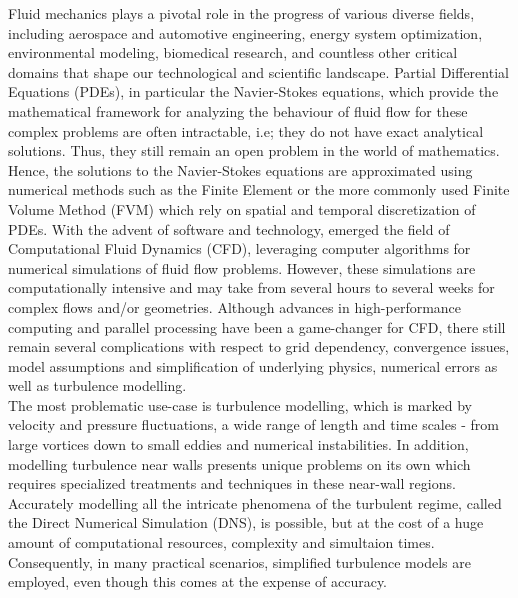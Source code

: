 Fluid mechanics plays a pivotal role in the progress of various diverse fields, including aerospace and automotive engineering, energy system optimization, environmental modeling, biomedical research, and countless other critical domains that shape our technological and scientific landscape. Partial Differential Equations (PDEs), in particular the Navier-Stokes equations, which provide the mathematical framework for analyzing the behaviour of fluid flow for these complex problems are often intractable, i.e; they do not have exact analytical solutions. Thus, they still remain an open problem in the world of mathematics. Hence, the solutions to the Navier-Stokes equations are approximated using numerical methods such as the Finite Element or the more commonly used Finite Volume Method (FVM) which rely on spatial and temporal discretization of PDEs. With the advent of software and technology, emerged the field of Computational Fluid Dynamics (CFD), leveraging computer algorithms for numerical simulations of fluid flow problems. However, these simulations are computationally intensive and may take from several hours to several weeks for complex flows and/or geometries. Although advances in high-performance computing and parallel processing have been a game-changer for CFD, there still remain several complications with respect to grid dependency, convergence issues, model assumptions and simplification of underlying physics, numerical errors as well as turbulence modelling. \\
The most problematic use-case is turbulence modelling, which is marked by velocity and pressure fluctuations, a wide range of length and time scales - from large vortices down to small eddies and numerical instabilities. In addition, modelling turbulence near walls presents unique problems on its own which requires specialized treatments and techniques in these near-wall regions. Accurately modelling all the intricate phenomena of the turbulent regime, called the Direct Numerical Simulation (DNS), is possible, but at the cost of a huge amount of computational resources, complexity and simultaion times. Consequently, in many practical scenarios, simplified turbulence models are employed, even though this comes at the expense of accuracy. \\
